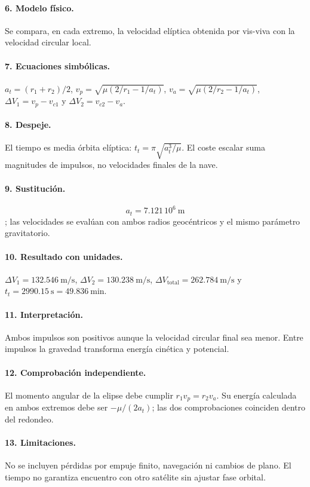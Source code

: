 \paragraph{6. Modelo físico.} Se compara, en cada extremo, la velocidad elíptica obtenida por vis-viva con la velocidad circular local.
\paragraph{7. Ecuaciones simbólicas.} $a_t=(r_1+r_2)/2$, $v_p=\sqrt{\mu(2/r_1-1/a_t)}$, $v_a=\sqrt{\mu(2/r_2-1/a_t)}$, $\Delta V_1=v_p-v_{c1}$ y $\Delta V_2=v_{c2}-v_a$.
\paragraph{8. Despeje.} El tiempo es media órbita elíptica: $t_t=\pi\sqrt{a_t^3/\mu}$. El coste escalar suma magnitudes de impulsos, no velocidades finales de la nave.
\paragraph{9. Sustitución.} \[a_t=7.121\,10^6\ \mathrm m\]; las velocidades se evalúan con ambos radios geocéntricos y el mismo parámetro gravitatorio.
\paragraph{10. Resultado con unidades.} $\Delta V_1=132.546\ \mathrm{m/s}$, $\Delta V_2=130.238\ \mathrm{m/s}$, $\Delta V_{\mathrm{total}}=262.784\ \mathrm{m/s}$ y $t_t=2990.15\ \mathrm s=49.836\ \mathrm{min}$.
\paragraph{11. Interpretación.} Ambos impulsos son positivos aunque la velocidad circular final sea menor. Entre impulsos la gravedad transforma energía cinética y potencial.
\paragraph{12. Comprobación independiente.} El momento angular de la elipse debe cumplir $r_1v_p=r_2v_a$. Su energía calculada en ambos extremos debe ser $-\mu/(2a_t)$; las dos comprobaciones coinciden dentro del redondeo.
\paragraph{13. Limitaciones.} No se incluyen pérdidas por empuje finito, navegación ni cambios de plano. El tiempo no garantiza encuentro con otro satélite sin ajustar fase orbital.

